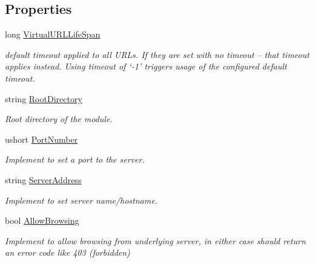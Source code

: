 \subsection*{Properties}
\begin{DoxyCompactItemize}
\item 
long \mbox{\hyperlink{interface_concord_1_1_c3_http_module_1_1_i_web_server_aa6d9d1a162473294ed3f2f7b3a0bb20e}{Virtual\+U\+R\+L\+Life\+Span}}
\begin{DoxyCompactList}\small\item\em default timeout applied to all U\+R\+Ls. If they are set with no timeout – that timeout applies instead. Using timeout of ‘-\/1’ triggers usage of the configured default timeout. \end{DoxyCompactList}\item 
string \mbox{\hyperlink{interface_concord_1_1_c3_http_module_1_1_i_web_server_a662a220f4a4e2ac3e3fb15c3793922a9}{Root\+Directory}}
\begin{DoxyCompactList}\small\item\em Root directory of the module. \end{DoxyCompactList}\item 
ushort \mbox{\hyperlink{interface_concord_1_1_c3_http_module_1_1_i_web_server_ad4c244b67193692f17344f71c4a06d7d}{Port\+Number}}
\begin{DoxyCompactList}\small\item\em Implement to set a port to the server. \end{DoxyCompactList}\item 
string \mbox{\hyperlink{interface_concord_1_1_c3_http_module_1_1_i_web_server_a1f882a747d0065af2ad71a4a3e04b48c}{Server\+Address}}
\begin{DoxyCompactList}\small\item\em Implement to set server name/hostname. \end{DoxyCompactList}\item 
bool \mbox{\hyperlink{interface_concord_1_1_c3_http_module_1_1_i_web_server_a45e192539d3cabc6d72ee850f758b3a2}{Allow\+Browsing}}
\begin{DoxyCompactList}\small\item\em Implement to allow browsing from underlying server, in either case should return an error code like 403 (forbidden) \end{DoxyCompactList}\end{DoxyCompactItemize}



